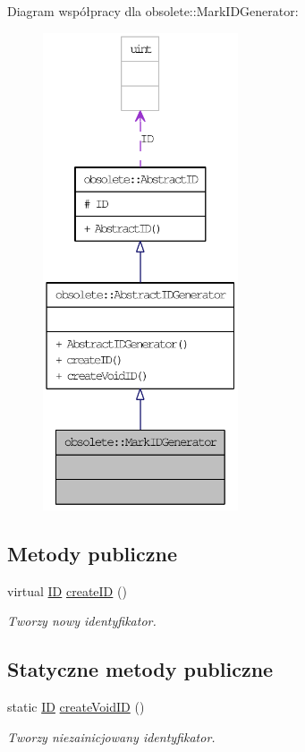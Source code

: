 Diagram współpracy dla obsolete::MarkIDGenerator:\nopagebreak
\begin{figure}[H]
\begin{center}
\leavevmode
\includegraphics[height=400pt]{classobsolete_1_1MarkIDGenerator__coll__graph}
\end{center}
\end{figure}
\subsection*{Metody publiczne}
\begin{DoxyCompactItemize}
\item 
virtual \hyperlink{classobsolete_1_1ID}{ID} \hyperlink{classobsolete_1_1AbstractIDGenerator_a39d2f0147e3a028fef8299770e23db90}{createID} ()
\begin{DoxyCompactList}\small\item\em Tworzy nowy identyfikator. \item\end{DoxyCompactList}\end{DoxyCompactItemize}
\subsection*{Statyczne metody publiczne}
\begin{DoxyCompactItemize}
\item 
static \hyperlink{classobsolete_1_1ID}{ID} \hyperlink{classobsolete_1_1AbstractIDGenerator_a330da88ba80820ca6ce0a29cbbab9e1b}{createVoidID} ()
\begin{DoxyCompactList}\small\item\em Tworzy niezainicjowany identyfikator. \item\end{DoxyCompactList}\end{DoxyCompactItemize}

